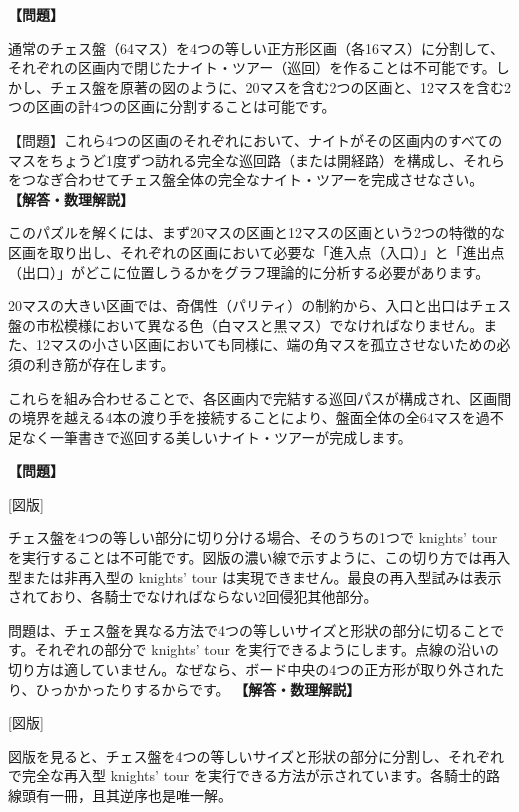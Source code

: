 \documentclass[10pt,a4paper,oneside,openany]{ltjsbook}
\begin{document}
\begin{tcolorbox}[colback=softblue,colframe=primaryblue,title=\textbf{第 338 問：区画分けされたチェス盤のナイト・ツアー （原題: THE BOARD IN COMPARTMENTS.）},arc=2mm,boxrule=1pt,breakable]
\textbf{【問題】}\par\vspace{0.3em}
通常のチェス盤（64マス）を4つの等しい正方形区画（各16マス）に分割して、それぞれの区画内で閉じたナイト・ツアー（巡回）を作ることは不可能です。しかし、チェス盤を原著の図のように、20マスを含む2つの区画と、12マスを含む2つの区画の計4つの区画に分割することは可能です。

【問題】これら4つの区画のそれぞれにおいて、ナイトがその区画内のすべてのマスをちょうど1度ずつ訪れる完全な巡回路（または開経路）を構成し、それらをつなぎ合わせてチェス盤全体の完全なナイト・ツアーを完成させなさい。
\tcblower
\textbf{【解答・数理解説】}\par\vspace{0.3em}
このパズルを解くには、まず20マスの区画と12マスの区画という2つの特徴的な区画を取り出し、それぞれの区画において必要な「進入点（入口）」と「進出点（出口）」がどこに位置しうるかをグラフ理論的に分析する必要があります。

20マスの大きい区画では、奇偶性（パリティ）の制約から、入口と出口はチェス盤の市松模様において異なる色（白マスと黒マス）でなければなりません。また、12マスの小さい区画においても同様に、端の角マスを孤立させないための必須の利き筋が存在します。

これらを組み合わせることで、各区画内で完結する巡回パスが構成され、区画間の境界を越える4本の渡り手を接続することにより、盤面全体の全64マスを過不足なく一筆書きで巡回する美しいナイト・ツアーが完成します。
\end{tcolorbox}

\begin{tcolorbox}[colback=softblue,colframe=primaryblue,title=\textbf{第 339 問：四騎士的旅程 （原題: THE FOUR KNIGHTS' TOURS.）},arc=2mm,boxrule=1pt,breakable]
\textbf{【問題】}\par\vspace{0.3em}
[図版]

チェス盤を4つの等しい部分に切り分ける場合、そのうちの1つで knights' tour を実行することは不可能です。図版の濃い線で示すように、この切り方では再入型または非再入型の knights' tour は実現できません。最良の再入型試みは表示されており、各騎士でなければならない2回侵犯其他部分。

問題は、チェス盤を異なる方法で4つの等しいサイズと形狀の部分に切ることです。それぞれの部分で knights' tour を実行できるようにします。点線の沿いの切り方は適していません。なぜなら、ボード中央の4つの正方形が取り外されたり、ひっかかったりするからです。
\tcblower
\textbf{【解答・数理解説】}\par\vspace{0.3em}
[図版]

図版を見ると、チェス盤を4つの等しいサイズと形狀の部分に分割し、それぞれで完全な再入型 knights' tour を実行できる方法が示されています。各騎士的路線頭有一冊，且其逆序也是唯一解。
\end{tcolorbox}
\end{document}
